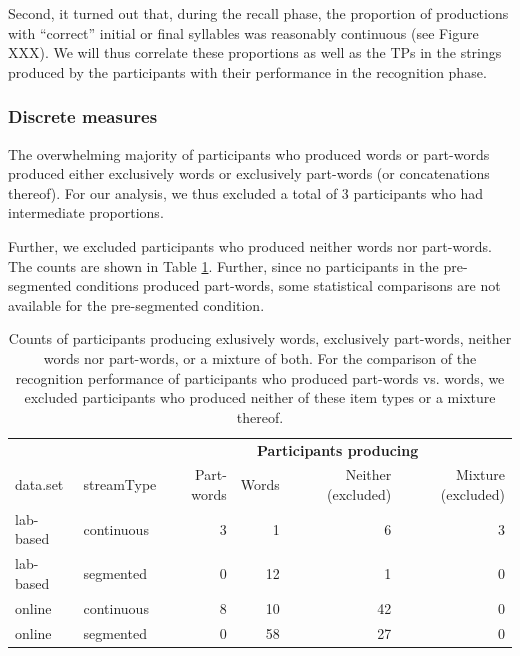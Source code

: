 \documentclass[
]{article}
\begin{document}
Second, it turned out that, during the recall phase, the proportion of
productions with ``correct'' initial or final syllables was reasonably
continuous (see Figure XXX). We will thus correlate these proportions as
well as the TPs in the strings produced by the participants with their
performance in the recognition phase.

\subsubsection{Discrete measures}\label{discrete-measures}

The overwhelming majority of participants who produced words or
part-words produced either exclusively words or exclusively part-words
(or concatenations thereof). For our analysis, we thus excluded a total
of 3 participants who had intermediate proportions.

Further, we excluded participants who produced neither words nor
part-words. The counts are shown in Table
\ref{tab:correlation-recognition-vs-recall-counts}. Further, since no
participants in the pre-segmented conditions produced part-words, some
statistical comparisons are not available for the pre-segmented
condition.

\begin{longtable}[t]{llrrrr}
\caption{\label{tab:correlation-recognition-vs-recall-counts}Counts of participants producing exlusively words, exclusively part-words, neither words nor part-words, or a mixture of both. For the comparison of the recognition performance of participants who produced part-words vs. words, we excluded participants who produced neither of these item types or a mixture thereof.}\\
\toprule
\multicolumn{2}{c}{\textbf{ }} & \multicolumn{4}{c}{\textbf{Participants producing}} \\
\cmidrule(l{3pt}r{3pt}){3-6}
data.set & streamType & Part-words & Words & Neither (excluded) & Mixture (excluded)\\
\midrule
lab-based & continuous & 3 & 1 & 6 & 3\\
lab-based & segmented & 0 & 12 & 1 & 0\\
online & continuous & 8 & 10 & 42 & 0\\
online & segmented & 0 & 58 & 27 & 0\\
\bottomrule
\end{longtable}
\end{document}
